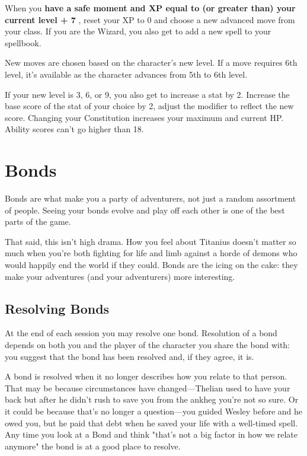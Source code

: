 When you {\bf have a safe moment and XP equal to (or greater than) your current level + 7} , reset your XP to 0 and choose a new advanced move from your class. If you are the Wizard, you also get to add a new spell to your spellbook.

       

New moves are chosen based on the character's new level. If a move requires 6th level, it's available as the character advances from 5th to 6th level.

       

If your new level is 3, 6, or 9, you also get to increase a stat by 2. Increase the base score of the stat of your choice by 2, adjust the modifier to reflect the new score. Changing your Constitution increases your maximum and current HP. Ability scores can't go higher than 18.

       
\section{Bonds}   
       

Bonds are what make you a party of adventurers, not just a random assortment of people. Seeing your bonds evolve and play off each other is one of the best parts of the game.

       

That said, this isn't high drama. How you feel about Titanius doesn't matter so much when you're both fighting for life and limb against a horde of demons who would happily end the world if they could. Bonds are the icing on the cake: they make your adventures (and your adventurers) more interesting.

       
\subsection{Resolving Bonds}   
       

At the end of each session you may resolve one bond. Resolution of a bond depends on both you and the player of the character you share the bond with: you suggest that the bond has been resolved and, if they agree, it is.

       

A bond is resolved when it no longer describes how you relate to that person. That may be because circumstances have changed—Thelian used to have your back but after he didn't rush to save you from the ankheg you're not so sure. Or it could be because that's no longer a question—you guided Wesley before and he owed you, but he paid that debt when he saved your life with a well-timed spell. Any time you look at a Bond and think "that's not a big factor in how we relate anymore" the bond is at a good place to resolve.

